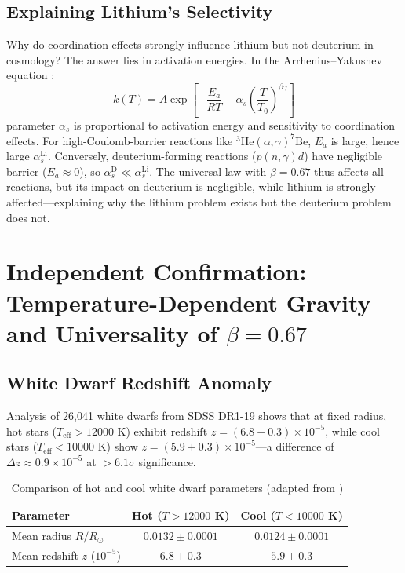\documentclass[12pt,a4paper]{article}
\theoremstyle{remark}
\newcommand{\alp}{\alpha}
\begin{document}
	\subsection{Explaining Lithium's Selectivity}
	
	Why do coordination effects strongly influence lithium but not deuterium in cosmology? The answer lies in activation energies. In the Arrhenius–Yakushev equation \cite{appendixC}:
	\begin{equation}
		k(T) = A \exp\left[-\frac{E_a}{RT} - \alp_s \left(\frac{T}{T_0}\right)^{\beta\gamma}\right]
		\label{eq:arrhenius_yak}
	\end{equation}
	parameter \(\alp_s\) is proportional to activation energy and sensitivity to coordination effects. For high-Coulomb-barrier reactions like \(^3\mathrm{He}(\alpha,\gamma)^7\mathrm{Be}\), \(E_a\) is large, hence large \(\alp_s^{\mathrm{Li}}\). Conversely, deuterium-forming reactions (\(p(n,\gamma)d\)) have negligible barrier (\(E_a \approx 0\)), so \(\alp_s^{\mathrm{D}} \ll \alp_s^{\mathrm{Li}}\). The universal law with \(\beta = 0.67\) thus affects all reactions, but its impact on deuterium is negligible, while lithium is strongly affected—explaining why the lithium problem exists but the deuterium problem does not.
	
	\section{Independent Confirmation: Temperature-Dependent Gravity and Universality of \(\beta = 0.67\)}
	\label{sec:universal-proof}
	
	\subsection{White Dwarf Redshift Anomaly}
	\label{subsec:wd-anomaly}
	
	Analysis of 26,041 white dwarfs from SDSS DR1-19 \cite{Crumpler2024} shows that at fixed radius, hot stars (\(T_{\mathrm{eff}} > 12000\) K) exhibit redshift \(z = (6.8 \pm 0.3) \times 10^{-5}\), while cool stars (\(T_{\mathrm{eff}} < 10000\) K) show \(z = (5.9 \pm 0.3) \times 10^{-5}\)—a difference of \(\Delta z \approx 0.9 \times 10^{-5}\) at \(>6.1\sigma\) significance.
	
	\begin{table}[h]
		\centering
		\caption{Comparison of hot and cool white dwarf parameters (adapted from \cite{Crumpler2024})}
		\label{tab:wd-results}
		\begin{tabular}{lcc}
			\toprule
			\textbf{Parameter} & \textbf{Hot (\(T>12000\) K)} & \textbf{Cool (\(T<10000\) K)} \\
			\midrule
			Mean radius \(R/R_\odot\) & \(0.0132 \pm 0.0001\) & \(0.0124 \pm 0.0001\) \\
			Mean redshift \(z\) (\(10^{-5}\)) & \(6.8 \pm 0.3\) & \(5.9 \pm 0.3\) \\
			\bottomrule
		\end{tabular}
	\end{table}
	
\end{document}
